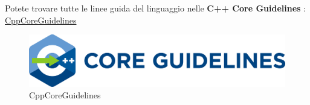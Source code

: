 \newpage

\textsf{\small Potete trovare tutte le linee guida del linguaggio nelle \textbf{C++ Core Guidelines} : \href{https://github.com/isocpp/CppCoreGuidelines}{CppCoreGuidelines}} \\


\begin{figure}[H]
	\centering
	\includegraphics[width=1\textwidth, height=1\textheight, keepaspectratio]{./imgs/CppCoreGuidelines.png}
	\caption{CppCoreGuidelines}
	\label{fig:CppCoreGuidelines}
\end{figure}

